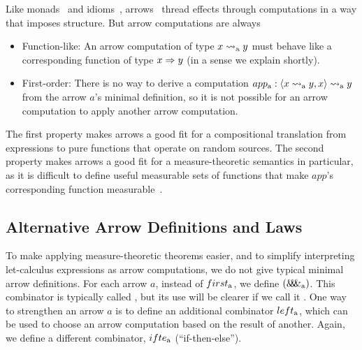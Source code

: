 Like monads~\cite{cit:wadler-2001-monads} and idioms~\cite{cit:mcbride-2008jfp-idiom}, arrows~\cite{cit:hughes-2000scp-arrows} thread effects through computations in a way that imposes structure.
But arrow computations are always
\begin{itemize}
	\item Function-like: An arrow computation of type $x \rightsquigarrow_\mathrm{a} y$ must behave like a corresponding function of type $x \Rightarrow y$ (in a sense we explain shortly).
	\item First-order: There is no way to derive a computation $app_\mathrm{a} : \langle{x \rightsquigarrow_\mathrm{a}y, x}\rangle \rightsquigarrow_\mathrm{a} y$ from the arrow $a$'s minimal definition, so it is not possible for an arrow computation to apply another arrow computation.
\end{itemize}
The first property makes arrows a good fit for a compositional translation from expressions to pure functions that operate on random sources.
The second property makes arrows a good fit for a measure-theoretic semantics in particular, as it is difficult to define useful measurable sets of functions that make $app$'s corresponding function measurable~\cite{cit:aumann-1961ijm-borel}.

\subsection{Alternative Arrow Definitions and Laws}
\label{sec:arrow-definitions}

To make applying measure-theoretic theorems easier, and to simplify interpreting let-calculus expressions as arrow computations, we do not give typical minimal arrow definitions.
For each arrow $a$, instead of $first_\mathrm{a}$, we define $(\mathit{\&\mspace{-7.5mu}\&\mspace{-7.5mu}\&}_\mathrm{a})$.
This combinator is typically called , but its use will be clearer if we call it .
One way to strengthen an arrow $a$ is to define an additional combinator $left_\mathrm{a}$, which can be used to choose an arrow computation based on the result of another.
Again, we define a different combinator, $ifte_\mathrm{a}$ (``if-then-else'').

